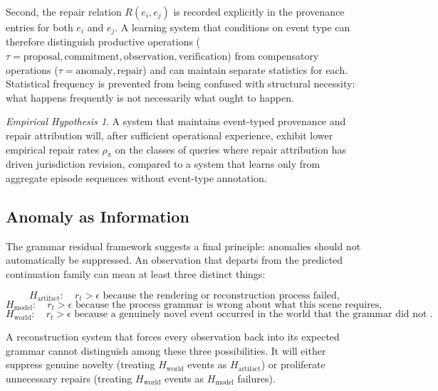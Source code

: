 \documentclass[11pt,a4paper]{article}
\theoremstyle{plain}
\theoremstyle{definition}
\theoremstyle{remark}
\newtheorem{hypothesis}[theorem]{Empirical Hypothesis}
\begin{document}
Second, the repair relation $R(e_i, e_j)$ is recorded explicitly in the provenance entries for both $e_i$ and $e_j$. A learning system that conditions on event type can therefore distinguish productive operations ($\tau = \mathrm{proposal}, \mathrm{commitment}, \mathrm{observation}, \mathrm{verification}$) from compensatory operations ($\tau = \mathrm{anomaly}, \mathrm{repair}$) and can maintain separate statistics for each. Statistical frequency is prevented from being confused with structural necessity: what happens frequently is not necessarily what ought to happen.

\begin{hypothesis}
\label{hyp:normalization}
A system that maintains event-typed provenance and repair attribution will, after sufficient operational experience, exhibit lower empirical repair rates $\rho_\pi$ on the classes of queries where repair attribution has driven jurisdiction revision, compared to a system that learns only from aggregate episode sequences without event-type annotation.
\end{hypothesis}

\subsection{Anomaly as Information}

The grammar residual framework suggests a final principle: anomalies should not automatically be suppressed. An observation that departs from the predicted continuation family can mean at least three distinct things:

\[
H_{\mathrm{artifact}}: \quad r_t > \epsilon \text{ because the rendering or reconstruction process failed},
\]
\[
H_{\mathrm{model}}: \quad r_t > \epsilon \text{ because the process grammar is wrong about what this scene requires},
\]
\[
H_{\mathrm{world}}: \quad r_t > \epsilon \text{ because a genuinely novel event occurred in the world that the grammar did not anticipate}.
\]

A reconstruction system that forces every observation back into its expected grammar cannot distinguish among these three possibilities. It will either suppress genuine novelty (treating $H_{\mathrm{world}}$ events as $H_{\mathrm{artifact}}$) or proliferate unnecessary repairs (treating $H_{\mathrm{world}}$ events as $H_{\mathrm{model}}$ failures).
\end{document}
